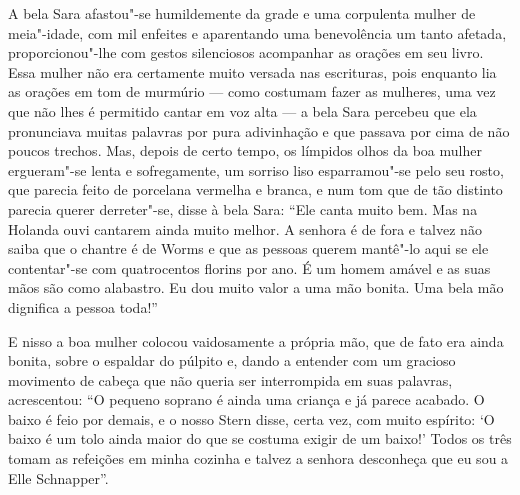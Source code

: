 A bela Sara afastou"-se humildemente da grade e uma corpulenta mulher
de meia"-idade, com mil enfeites e aparentando uma benevolência um
tanto afetada, proporcionou"-lhe com gestos silenciosos acompanhar as
orações em seu livro. Essa mulher não era certamente muito versada nas
escrituras, pois enquanto lia as orações em tom de murmúrio --- como
costumam fazer as mulheres, uma vez que não lhes é permitido cantar em
voz alta --- a bela Sara percebeu que ela pronunciava muitas palavras por
pura adivinhação e que passava por cima de não poucos trechos. Mas,
depois de certo tempo, os límpidos olhos da boa mulher ergueram"-se
lenta e sofregamente, um sorriso liso esparramou"-se pelo seu rosto,
que parecia feito de porcelana vermelha e branca, e num tom que de tão
distinto parecia querer derreter"-se, disse à bela Sara: ``Ele canta
muito bem. Mas na Holanda ouvi cantarem ainda muito melhor. A senhora é
de fora e talvez não saiba que o chantre é de Worms e que as pessoas
querem mantê"-lo aqui se ele contentar"-se com quatrocentos florins
por ano. É um homem amável e as suas mãos são como alabastro. Eu dou
muito valor a uma mão bonita. Uma bela mão dignifica a pessoa toda!''

E nisso a boa mulher colocou vaidosamente a própria mão, que de fato era
ainda bonita, sobre o espaldar do púlpito e, dando a entender com um
gracioso movimento de cabeça que não queria ser interrompida em suas
palavras, acrescentou: ``O pequeno soprano é ainda uma criança e já
parece acabado. O baixo é feio por demais, e o nosso Stern disse, certa
vez, com muito espírito: ‘O baixo é um tolo ainda maior do que se
costuma exigir de um baixo!’ Todos os três tomam as refeições em minha
cozinha e talvez a senhora desconheça que eu sou a Elle Schnapper''.

